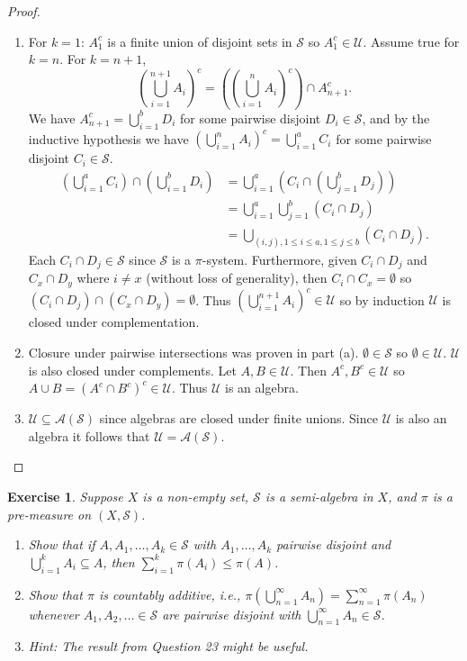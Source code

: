 \documentclass{article}
\newtheorem{exercise}[theorem]{Exercise}
\begin{document}
\begin{proof}
\begin{enumerate}
    \item[(a)] For $k=1$: $A_1^c$ is a finite union of disjoint sets in $\mathcal{S}$ so $A_1^c\in\mathcal{U}$. Assume true for $k=n$. For $k=n+1$, \[(\bigcup_{i=1}^{n+1}A_i)^c=((\bigcup_{i=1}^{n}A_i)^c)\cap A_{n+1}^c.\] We have $A_{n+1}^c=\bigcup_{i=1}^b D_i$ for some pairwise disjoint $D_i\in\mathcal{S}$, and by the inductive hypothesis we have $(\bigcup_{i=1}^{n}A_i)^c=\bigcup_{i=1}^a C_i$ for some pairwise disjoint $C_i\in\mathcal{S}$. \begin{align*}(\bigcup_{i=1}^a C_i)\cap(\bigcup_{i=1}^b D_i)&=\bigcup_{i=1}^a(C_i\cap(\bigcup_{j=1}^b D_j))\\&=\bigcup_{i=1}^a\bigcup_{j=1}^b(C_i\cap D_j)\\&=\bigcup_{(i,j),1\leq i\leq a,1\leq j\leq b}(C_i\cap D_j).\end{align*} Each $C_i\cap D_j\in\mathcal{S}$ since $\mathcal{S}$ is a $\pi$-system. Furthermore, given $C_i\cap D_j$ and $C_x\cap D_y$ where $i\neq x$ (without loss of generality), then $C_i\cap C_x=\emptyset$ so $(C_i\cap D_j)\cap(C_x\cap D_y)=\emptyset$. Thus $(\bigcup_{i=1}^{n+1}A_i)^c\in\mathcal{U}$ so by induction $\mathcal{U}$ is closed under complementation.
    \item[(b)] Closure under pairwise intersections was proven in part (a). $\emptyset\in\mathcal{S}$ so $\emptyset\in\mathcal{U}$. $\mathcal{U}$ is also closed under complements. Let $A,B\in\mathcal{U}$. Then $A^c,B^c\in\mathcal{U}$ so $A\cup B=(A^c\cap B^c)^c\in\mathcal{U}$. Thus $\mathcal{U}$ is an algebra.
    \item[(c)] $\mathcal{U}\subseteq\mathcal{A}(\mathcal{S})$ since algebras are closed under finite unions. Since $\mathcal{U}$ is also an algebra it follows that $\mathcal{U}=\mathcal{A}(\mathcal{S})$.
\end{enumerate}
\end{proof}
\begin{exercise}
    Suppose $X$ is a non-empty set, $\mathcal{S}$ is a semi-algebra in $X$, and $\pi$ is a pre-measure on $(X, \mathcal{S})$.
    \begin{enumerate}
        \item[(a)] Show that if $A, A_1, \dots, A_k \in \mathcal{S}$ with $A_1, \dots, A_k$ pairwise disjoint and $\bigcup_{i=1}^k A_i \subseteq A$, then $\sum_{i=1}^k \pi(A_i) \leq \pi(A)$.
        \item[(b)] Show that $\pi$ is countably additive, i.e., $\pi(\bigcup_{n=1}^\infty A_n) = \sum_{n=1}^\infty \pi(A_n)$ whenever $A_1, A_2, \dots \in \mathcal{S}$ are pairwise disjoint with $\bigcup_{n=1}^\infty A_n \in \mathcal{S}$.
        \item[] \textit{Hint: The result from Question 23 might be useful.}
    \end{enumerate}
\end{exercise}
\end{document}

